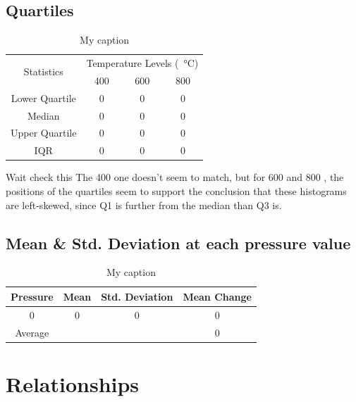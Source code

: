 \documentclass[letterpaper]{article}
\begin{document}
  \subsection{Quartiles}

    \begin{table}[H]
    \centering
    \begin{tabular}{c|c|c|c|}
    \multirow{2}{*}{Statistics} & \multicolumn{3}{c|}{Temperature Levels (\SI{}{\celsius})} \\ \cline{2-4}
                                & 400           & 600          & 800          \\ \hline
    Lower Quartile              & 0             & 0            & 0            \\ \hline
    Median                      & 0             & 0            & 0            \\ \hline
    Upper Quartile              & 0             & 0            & 0            \\ \hline
    IQR                         & 0             & 0            & 0            \\ \hline
    \end{tabular}
    \caption{My caption}
    \label{tempquart}
    \end{table}

    Wait check this
    The 400  one doesn’t seem to match, but for 600  and 800 , the positions of the quartiles seem to support the conclusion that these histograms are left-skewed, since Q1 is further from the median than Q3 is.
  \subsection{Mean \& Std. Deviation at each pressure value}

    \begin{table}[H]
    \centering
    \begin{tabular}{c|c|c|c|}
    Pressure & Mean & Std. Deviation & Mean Change \\ \hline
    0        & 0    & 0              & 0           \\ \hline
    Average  &      &                & 0           \\ \hline
    \end{tabular}
    \caption{My caption}
    \label{pressurestat}
    \end{table}

\section{Relationships}
\end{document}
